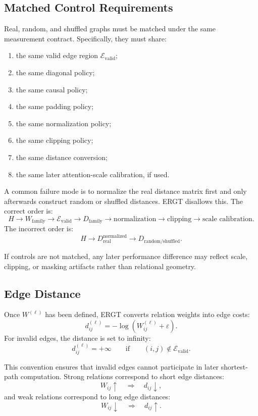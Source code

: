\documentclass[11pt]{article}
\begin{document}
\subsection{Matched Control Requirements}

Real, random, and shuffled graphs must be matched under the same measurement contract. Specifically, they must share:
\begin{enumerate}[label=(\roman*)]
    \item the same valid edge region $\mathcal{E}_{\mathrm{valid}}$;
    \item the same diagonal policy;
    \item the same causal policy;
    \item the same padding policy;
    \item the same normalization policy;
    \item the same clipping policy;
    \item the same distance conversion;
    \item the same later attention-scale calibration, if used.
\end{enumerate}

A common failure mode is to normalize the real distance matrix first and only afterwards construct random or shuffled distances. ERGT disallows this. The correct order is:
\[
H
\rightarrow
W_{\mathrm{family}}
\rightarrow
\mathcal{E}_{\mathrm{valid}}
\rightarrow
D_{\mathrm{family}}
\rightarrow
\text{normalization}
\rightarrow
\text{clipping}
\rightarrow
\text{scale calibration}.
\]
The incorrect order is:
\[
H
\rightarrow
D_{\mathrm{real}}^{\mathrm{normalized}}
\rightarrow
D_{\mathrm{random/shuffled}}.
\]

If controls are not matched, any later performance difference may reflect scale, clipping, or masking artifacts rather than relational geometry.

\subsection{Edge Distance}

Once $W^{(\ell)}$ has been defined, ERGT converts relation weights into edge costs:
\[
d_{ij}^{(\ell)}
=
-
\log(W_{ij}^{(\ell)}+\varepsilon).
\]
For invalid edges, the distance is set to infinity:
\[
d_{ij}^{(\ell)}=+\infty
\qquad
\text{if}
\qquad
(i,j)\notin\mathcal{E}_{\mathrm{valid}}.
\]

This convention ensures that invalid edges cannot participate in later shortest-path computation. Strong relations correspond to short edge distances:
\[
W_{ij}\uparrow
\quad\Rightarrow\quad
 d_{ij}\downarrow,
\]
and weak relations correspond to long edge distances:
\[
W_{ij}\downarrow
\quad\Rightarrow\quad
 d_{ij}\uparrow.
\]
\end{document}
